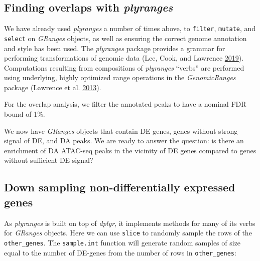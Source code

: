 \documentclass[
]{article}
\newenvironment{Shaded}{}{}
\newcommand{\FloatTok}[1]{\textcolor[rgb]{0.25,0.63,0.44}{#1}}
\newcommand{\KeywordTok}[1]{\textcolor[rgb]{0.00,0.44,0.13}{\textbf{#1}}}
\newcommand{\NormalTok}[1]{#1}
\newcommand{\OperatorTok}[1]{\textcolor[rgb]{0.40,0.40,0.40}{#1}}
\newcommand{\StringTok}[1]{\textcolor[rgb]{0.25,0.44,0.63}{#1}}
\begin{document}
\hypertarget{finding-overlaps-with-plyranges}{%
\subsection{\texorpdfstring{Finding overlaps with \emph{plyranges}}{Finding overlaps with plyranges}}\label{finding-overlaps-with-plyranges}}

We have already used \emph{plyranges} a number of times above, to \texttt{filter}, \texttt{mutate},
and \texttt{select} on \emph{GRanges} objects, as well as ensuring the correct genome
annotation and style has been used. The \emph{plyranges} package provides a grammar
for performing transformations of genomic data (Lee, Cook, and Lawrence \protect\hyperlink{ref-Lee2019}{2019}). Computations
resulting from compositions of \emph{plyranges} ``verbs'' are performed using
underlying, highly optimized range operations in the \emph{GenomicRanges} package
(Lawrence et al. \protect\hyperlink{ref-granges}{2013}).

For the overlap analysis, we filter the annotated peaks to have a nominal FDR
bound of 1\%.

\begin{Shaded}
\end{Shaded}

We now have \emph{GRanges} objects that contain DE genes, genes without strong
signal of DE, and DA peaks. We are ready to answer the question: is there an
enrichment of DA ATAC-seq peaks in the vicinity of DE genes compared to genes
without sufficient DE signal?

\hypertarget{down-sampling-non-differentially-expressed-genes}{%
\subsection{Down sampling non-differentially expressed genes}\label{down-sampling-non-differentially-expressed-genes}}

As \emph{plyranges} is built on top of \emph{dplyr}, it implements methods for many of
its verbs for \emph{GRanges} objects. Here we can use \texttt{slice} to randomly sample
the rows of the \texttt{other\_genes}. The \texttt{sample.int} function will generate random
samples of size equal to the number of DE-genes from the number of rows in
\texttt{other\_genes}:
\end{document}
